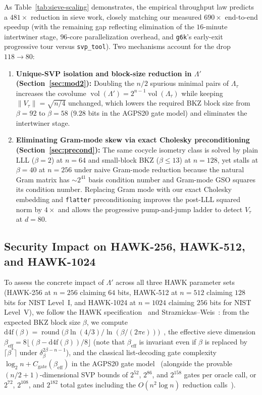\documentclass[11pt,a4paper]{article}
\theoremstyle{definition}
\newcommand{\Lt}{\Lambda_\tau}
\newcommand{\Lp}{\Lambda'}
\newcommand{\Vt}{V_\tau}
\newcommand{\vol}{\operatorname{vol}}
\begin{document}
As Table~\ref{tab:sieve-scaling} demonstrates, the empirical throughput law predicts a $481\times$ reduction in sieve work, closely matching our measured $690\times$ end-to-end speedup (with the remaining gap reflecting elimination of the $16$-minute intertwiner stage, $96$-core parallelization overhead, and \texttt{g6k}'s early-exit progressive tour versus \texttt{svp\_tool}). Two mechanisms account for the drop $118 \to 80$:
\begin{enumerate}[leftmargin=*]
\item \textbf{Unique-SVP isolation and block-size reduction in $\Lp$ (Section~\ref{sec:mod2}):} Doubling the $n/2$ spurious minimal pairs of $\Lt$ increases the covolume $\vol(\Lp) = 2^{n-1}\vol(\Lt)$ while keeping $\|\Vt\| = \sqrt{n/4}$ unchanged, which lowers the required BKZ block size from $\beta=92$ to $\beta=58$ ($9.28$ bits in the AGPS20 gate model) and eliminates the intertwiner stage.
\item \textbf{Eliminating Gram-mode skew via exact Cholesky preconditioning (Section~\ref{sec:precond}):} The same cocycle isometry class is solved by plain LLL ($\beta=2$) at $n=64$ and small-block BKZ ($\beta \le 13$) at $n=128$, yet stalls at $\beta=40$ at $n=256$ under naive Gram-mode reduction because the natural Gram matrix has $\sim 2^{41}$ basis condition number and Gram-mode GSO squares its condition number. Replacing Gram mode with our exact Cholesky embedding and \texttt{flatter} preconditioning improves the post-LLL squared norm by $4\times$ and allows the progressive pump-and-jump ladder to detect $\Vt$ at $d=80$.
\end{enumerate}

\subsection{Security Impact on HAWK-256, HAWK-512, and HAWK-1024}
\label{subsec:extrap}
To assess the concrete impact of $\Lp$ across all three HAWK parameter sets (HAWK-256 at $n=256$ claiming $64$ bits, HAWK-512 at $n=512$ claiming $128$ bits for NIST Level~I, and HAWK-1024 at $n=1024$ claiming $256$ bits for NIST Level~V), we follow the HAWK specification~\cite[\S 5.3]{HAWK25} and Straznickas--Weis~\cite[Appendix~C]{SW26}: from the expected BKZ block size $\beta$, we compute $\mathrm{d4f}(\beta) = \operatorname{round}\bigl(\beta\ln(4/3)/\ln(\beta/(2\pi e))\bigr)$~\cite{Duc18}, the effective sieve dimension $\beta_{\mathrm{eff}} = 8\lfloor(\beta - \mathrm{d4f}(\beta))/8\rfloor$ (note that $\beta_{\mathrm{eff}}$ is invariant even if $\beta$ is replaced by $\lceil\beta^*\rceil$ under $\delta_\beta^{2\beta - n - 1}$), and the classical list-decoding gate complexity $\log_2 n + C_{\mathrm{gate}}(\beta_{\mathrm{eff}})$ in the AGPS20 gate model~\cite{AGPS20,SW26} (alongside the provable $(n/2+1)$-dimensional SVP bounds of $2^{52}$, $2^{86}$, and $2^{158}$ gates per oracle call, or $2^{72}$, $2^{108}$, and $2^{182}$ total gates including the $O(n^2\log n)$ reduction calls~\cite{Duc23,SW26}).
\end{document}
